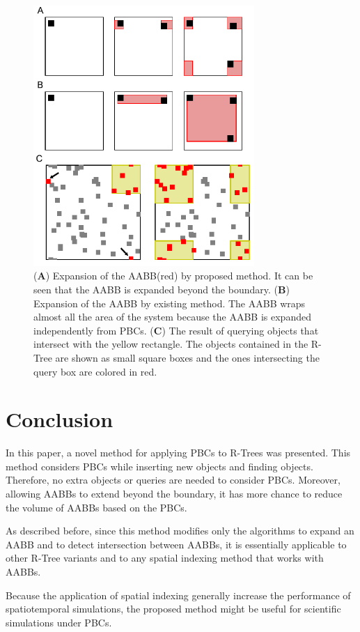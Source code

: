 \documentclass[10pt,letterpaper,twocolumn]{article}
\begin{document}
\begin{figure}[tb]
    \includegraphics[width=8.4cm, bb=3 6 237 282]{fig-result-expand-intersect.eps}
    \caption{
    (\textbf{A})
    Expansion of the AABB(red) by proposed method.
    It can be seen that the AABB is expanded beyond the boundary.
    (\textbf{B})
    Expansion of the AABB by existing method.
    The AABB wraps almost all the area of the system
    because the AABB is expanded independently from PBCs.
    (\textbf{C})
    The result of querying objects that intersect with the yellow rectangle.
    The objects contained in the R-Tree are shown as small square boxes
    and the ones intersecting the query box are colored in red.
    }
    \label{fig-result}
\end{figure}

\section*{Conclusion}

In this paper, a novel method for applying PBCs to R-Trees was presented.
This method considers PBCs while inserting new objects and finding objects.
Therefore, no extra objects or queries are needed to consider PBCs.
Moreover, allowing AABBs to extend beyond the boundary, it has more chance to
reduce the volume of AABBs based on the PBCs.

As described before, since this method modifies only the algorithms to expand an
AABB and to detect intersection between AABBs, it is essentially applicable to
other R-Tree variants and to any spatial indexing method that works with AABBs.

Because the application of spatial indexing generally increase the performance
of spatiotemporal simulations, the proposed method might be useful for
scientific simulations under PBCs.


{}
\end{document}
